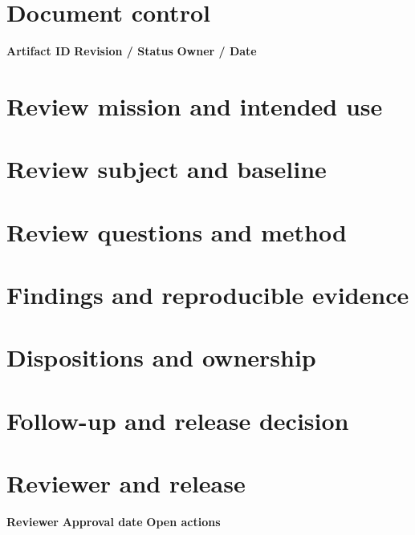 \documentclass[10pt,letterpaper]{article}
\begin{document}
\DocProvenance
\section{Document control}
\textbf{Artifact ID}
\textbf{Revision / Status}
\textbf{Owner / Date}
\section{Review mission and intended use}
\section{Review subject and baseline}
\section{Review questions and method}
\section{Findings and reproducible evidence}
\section{Dispositions and ownership}
\section{Follow-up and release decision}
\section{Reviewer and release}
\textbf{Reviewer}
\textbf{Approval date}
\textbf{Open actions}
\end{document}
